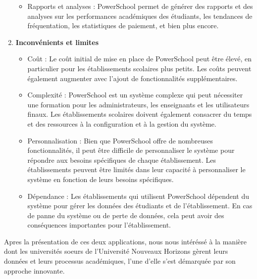 \begin{enumerate}
\begin{itemize}
            \item Rapports et analyses : PowerSchool permet de générer des rapports et des analyses sur les performances académiques des étudiants, les tendances de fréquentation, les statistiques de paiement, et bien plus encore.
        \end{itemize}
    \newpage
    \item \textbf{Inconvénients et limites}
        \begin{itemize}
            \item Coût : Le coût initial de mise en place de PowerSchool peut être élevé, en particulier pour les établissements scolaires plus petits. Les coûts peuvent également augmenter avec l'ajout de fonctionnalités supplémentaires.
            \item Complexité : PowerSchool est un système complexe qui peut nécessiter une formation pour les administrateurs, les enseignants et les utilisateurs finaux. Les établissements scolaires doivent également consacrer du temps et des ressources à la configuration et à la gestion du système.
            \item Personnalisation : Bien que PowerSchool offre de nombreuses fonctionnalités, il peut être difficile de personnaliser le système pour répondre aux besoins spécifiques de chaque établissement. Les établissements peuvent être limités dans leur capacité à personnaliser le système en fonction de leurs besoins spécifiques.
            \item Dépendance : Les établissements qui utilisent PowerSchool dépendent du système pour gérer les données des étudiants et de l'établissement. En cas de panne du système ou de perte de données, cela peut avoir des conséquences importantes pour l'établissement.
        \end{itemize}
\end{enumerate}

Apres la présentation de ces deux applications, nous nous intéréssé à la manière dont les
universités soeurs de l'Université Nouveaux Horizons gèrent leurs données et leurs
processus académiques, l'une d'elle s'est démarquée par son approche innovante.

